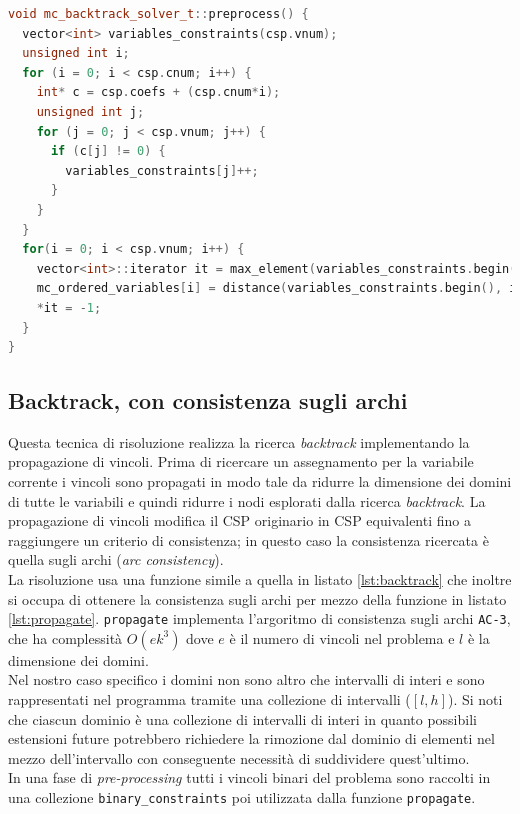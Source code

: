 \documentclass[10pt, a4paper]{article}
\begin{document}
\begin{lstlisting}[language=C++, caption=Funzione \texttt{preprocess} per la risoluzione \textit{backtrack}, label=lst:preprocess_mc]
void mc_backtrack_solver_t::preprocess() {
  vector<int> variables_constraints(csp.vnum);
  unsigned int i;
  for (i = 0; i < csp.cnum; i++) {
    int* c = csp.coefs + (csp.cnum*i);
    unsigned int j;
    for (j = 0; j < csp.vnum; j++) {
      if (c[j] != 0) {
        variables_constraints[j]++;
      }
    }
  }
  for(i = 0; i < csp.vnum; i++) {
    vector<int>::iterator it = max_element(variables_constraints.begin(), variables_constraints.end());
    mc_ordered_variables[i] = distance(variables_constraints.begin(), it);
    *it = -1;   
  }
}
\end{lstlisting}

\subsection{Backtrack, con consistenza sugli archi}
\label{sec:backtrack_ac}

Questa tecnica di risoluzione realizza la ricerca \textit{backtrack} implementando la propagazione di vincoli. Prima di ricercare un assegnamento per la variabile corrente i vincoli sono propagati in modo tale da ridurre la dimensione dei domini di tutte le variabili e quindi ridurre i nodi esplorati dalla ricerca \textit{backtrack}. La propagazione di vincoli modifica il CSP originario in CSP equivalenti fino a raggiungere un criterio di consistenza; in questo caso la consistenza ricercata è quella sugli archi (\textit{arc consistency}).\\
La risoluzione usa una funzione simile a quella in listato \ref{lst:backtrack} che inoltre si occupa di ottenere la consistenza sugli archi per mezzo della funzione in listato \ref{lst:propagate}. \texttt{propagate} implementa l'argoritmo di consistenza sugli archi \texttt{AC-3}, che ha complessità $O(ek^3)$ dove $e$ è il numero di vincoli nel problema e $l$ è la dimensione dei domini.\\
Nel nostro caso specifico i domini non sono altro che intervalli di interi e sono rappresentati nel programma tramite una collezione di intervalli ($\left [ l, h \right ]$). Si noti che ciascun dominio è una collezione di intervalli di interi in quanto possibili estensioni future potrebbero richiedere la rimozione dal dominio di elementi nel mezzo dell'intervallo con conseguente necessità di suddividere quest'ultimo.\\
In una fase di \textit{pre-processing} tutti i vincoli binari del problema sono raccolti in una collezione \texttt{binary\_constraints} poi utilizzata dalla funzione \texttt{propagate}.
\end{document}
